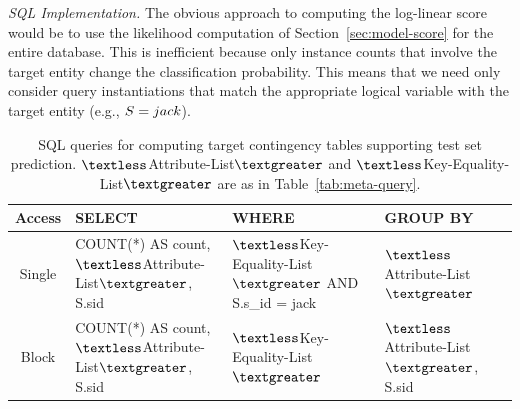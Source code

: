 {\em SQL Implementation.} 
The obvious approach to computing the log-linear score would be to use the likelihood computation of Section~\ref{sec:model-score} for the entire database.
This is inefficient because only instance counts that involve the target entity change the classification probability. 
This means that we need only consider query instantiations that match the appropriate logical variable with the target entity (e.g., $\S = jack$). 

\begin{table}[t]
\caption{SQL queries for computing target contingency tables supporting test set prediction.  $\textless$Attribute-List$\textgreater$ and  $\textless$Key-Equality-List$\textgreater$ are as in Table~\ref{tab:meta-query}.}
\begin{center}
\begin{tabular}{|c|p{6cm}|p{5cm}|p{4cm}|}
\hline
Access &SELECT&WHERE&GROUP BY\\\hline
Single &COUNT(*) AS count, $\textless$Attribute-List$\textgreater$, S.sid& $\textless$Key-Equality-List$\textgreater$ AND S.s\_id = jack&  $\textless$Attribute-List$\textgreater$\\
\hline
Block & COUNT(*) AS count,  $\textless$Attribute-List$\textgreater$, S.sid& $\textless$Key-Equality-List$\textgreater$ &  $\textless$Attribute-List$\textgreater$, S.sid\\\hline
\end{tabular}
\end{center}
\label{table:target-query}
\end{table}%





